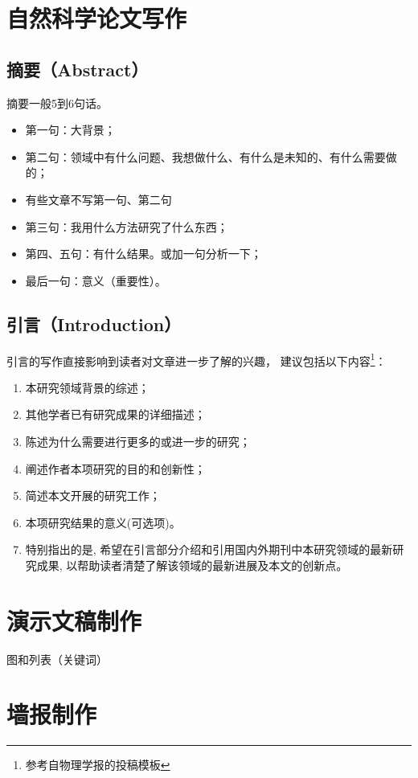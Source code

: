 \section{自然科学论文写作}
\subsection{摘要（Abstract）}
摘要一般5到6句话。
\begin{itemize}
\item 第一句：大背景；
\item 第二句：领域中有什么问题、我想做什么、有什么是未知的、有什么需要做的；
\item 有些文章不写第一句、第二句
\item 第三句：我用什么方法研究了什么东西；
\item 第四、五句：有什么结果。或加一句分析一下；
\item 最后一句：意义（重要性）。
\end{itemize}


\subsection{引言（Introduction）}
引言的写作直接影响到读者对文章进一步了解的兴趣， 建议包括以下内容\footnote{参考自物理学报的投稿模板}：
\begin{enumerate}
\item 本研究领域背景的综述；
\item 其他学者已有研究成果的详细描述；
\item 陈述为什么需要进行更多的或进一步的研究；
\item 阐述作者本项研究的目的和创新性；
\item 简述本文开展的研究工作；
\item 本项研究结果的意义(可选项)。
\item 特别指出的是, 希望在引言部分介绍和引用国内外期刊中本研究领域的最新研究成果, 以帮助读者清楚了解该领域的最新进展及本文的创新点。
\end{enumerate}



\section{演示文稿制作}
图和列表（关键词）



\section{墙报制作}








